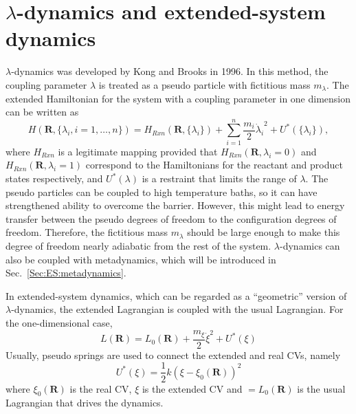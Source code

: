 \section{\texorpdfstring{$\lambda$-dynamics and extended-system dynamics}{λ-dynamics and extended-system dynamics}\label{Sec:ES:lambdadynamics}}
$\lambda$-dynamics was developed by Kong and Brooks in 1996.\cite{KongJCP1996} In this method, the coupling parameter $\lambda$ is treated as a pseudo particle with fictitious mass $m_\lambda$.
The extended Hamiltonian for the system with a coupling parameter in one dimension can be written as
\begin{equation}
	H(\mathbf{R},\{\lambda_i, i=1,\dots,n\})=H_{Rxn}(\mathbf{R},\{\lambda_i\}) + \sum_{i=1}^n\frac{m_i}{2}{\dot{\lambda}_i}^2+U^{*}(\{\lambda_i\}),
\end{equation}
where $H_{Rxn}$ is a legitimate mapping provided that $H_{Rxn}(\mathbf{R},\lambda_i=0)$ and $H_{Rxn}(\mathbf{R},\lambda_i=1)$ correspond to the Hamiltonians for the reactant and product states respectively, and $U^{*}(\lambda)$ is a restraint that limits the range of $\lambda$. The pseudo particles can be coupled to high temperature baths, so it can have strengthened ability to overcome the barrier. However, this might lead to energy transfer between the pseudo degrees of freedom to the configuration degrees of freedom. Therefore, the fictitious mass $m_\lambda$ should be large enough to make this degree of freedom nearly adiabatic from the rest of the system.\cite{AbramsJCP2006} $\lambda$-dynamics can also be coupled with metadynamics,\cite{WuJPCL2011} which will be introduced in Sec.~\ref{Sec:ES:metadynamics}.

In extended-system dynamics, which can be regarded as a ``geometric'' version of $\lambda$-dynamics, the extended Lagrangian is coupled with the usual Lagrangian. For the one-dimensional case,
\begin{equation}
	L(\mathbf{R})=L_{0}(\mathbf{R}) + \frac{m_\xi}{2}{\dot{\xi}}^2+U^{*}(\xi)
\end{equation}
Usually, pseudo springs are used to connect the extended and real CVs, namely
\begin{equation}
	U^{*}(\xi)=\frac{1}{2}k(\xi-\xi_{0}(\mathbf{R}))^{2}
\end{equation}
where $\xi_{0}(\mathbf{R})$ is the real CV, $\xi$ is the extended CV and $=L_{0}(\mathbf{R})$ is the usual Lagrangian that drives the dynamics.

